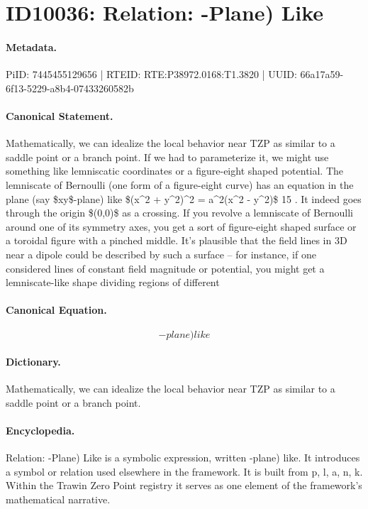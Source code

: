 \section*{ID10036: Relation: -Plane) Like}
\paragraph{Metadata.}
PiID: 7445455129656 | RTEID: RTE:P38972.0168:T1.3820 | UUID: 66a17a59-6f13-5229-a8b4-07433260582b

\paragraph{Canonical Statement.}
Mathematically, we can idealize the local behavior near TZP as similar to a saddle point or a branch point. If we had to parameterize it, we might use something like lemniscatic coordinates or a figure-eight shaped potential. The lemniscate of Bernoulli (one form of a figure-eight curve) has an equation in the plane (say \$xy\$-plane) like \$(x\textasciicircum{}2 + y\textasciicircum{}2)\textasciicircum{}2 = a\textasciicircum{}2(x\textasciicircum{}2 - y\textasciicircum{}2)\$ 15 . It indeed goes through the origin \$(0,0)\$ as a crossing. If you revolve a lemniscate of Bernoulli around one of its symmetry axes, you get a sort of figure-eight shaped surface or a toroidal figure with a pinched middle. It’s plausible that the field lines in 3D near a dipole could be described by such a surface – for instance, if one considered lines of constant field magnitude or potential, you might get a lemniscate-like shape dividing regions of different

\paragraph{Canonical Equation.}
\[
-plane) like
\]

\paragraph{Dictionary.}
Mathematically, we can idealize the local behavior near TZP as similar to a saddle point or a branch point.

\paragraph{Encyclopedia.}
Relation: -Plane) Like is a symbolic expression, written -plane) like. It introduces a symbol or relation used elsewhere in the framework. It is built from p, l, a, n, k. Within the Trawin Zero Point registry it serves as one element of the framework's mathematical narrative.
